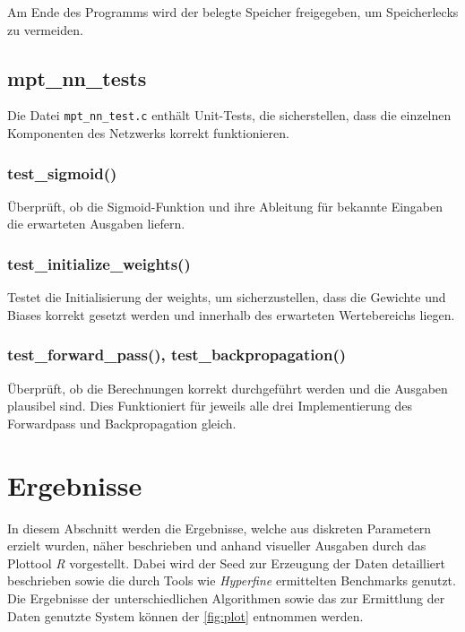 \documentclass[a4paper, 12pt]{article}
\begin{document}
Am Ende des Programms wird der belegte Speicher freigegeben, um Speicherlecks zu vermeiden.

\subsection{mpt\_nn\_tests}
\label{subsec:mpt_nn_tests}

Die Datei \texttt{mpt\_nn\_test.c} enthält Unit-Tests, die sicherstellen, dass die einzelnen Komponenten des Netzwerks korrekt funktionieren.

\subsubsection{test\_sigmoid()}

Überprüft, ob die Sigmoid-Funktion und ihre Ableitung für bekannte Eingaben die erwarteten Ausgaben liefern.

\subsubsection{test\_initialize\_weights()}

Testet die Initialisierung der weights, um sicherzustellen, dass die Gewichte und Biases korrekt gesetzt werden und innerhalb des erwarteten Wertebereichs liegen.

\subsubsection{test\_forward\_pass(), test\_backpropagation()}

Überprüft, ob die Berechnungen korrekt durchgeführt werden und die Ausgaben plausibel sind.
Dies Funktioniert für jeweils alle drei Implementierung des Forwardpass und Backpropagation gleich.

\newpage %

\section{Ergebnisse}\label{chapter..4}

In diesem Abschnitt werden die Ergebnisse, welche aus diskreten Parametern erzielt wurden, näher 
beschrieben und anhand visueller Ausgaben durch das Plottool \textit{R} vorgestellt. Dabei wird der 
Seed zur Erzeugung der Daten detailliert beschrieben sowie die durch Tools wie \textit{Hyperfine} 
ermittelten Benchmarks genutzt. Die Ergebnisse der unterschiedlichen Algorithmen sowie das zur 
Ermittlung der Daten genutzte System können der \autoref{fig:plot} entnommen werden.
\end{document}
